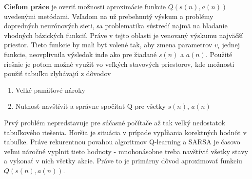 {\bf Cieľom práce} je overiť možnosti aproximácie funkcie $Q(s(n), a(n))$
uvedenými metódami. Vzľadom na už prebehnutý výskum a problémy dopredných
neurónových sieti, sa problematika sústredí najmä
na hľadanie vhodných bázických funkcií. Práve v tejto oblasti je venovaný výskumu
najväčší priestor. Tieto funkcie by mali byť volené tak, aby zmena parametrov $v_i$ jednej
funkcie, neovplivnila výsledok inde ako pre žiadané $s(n)$ a $a(n)$.
Použité riešnie je potom možné využiť vo veľkých stavových priestorov, kde možnosti použiť tabuľku
zlyhávajú z dôvodov
\begin{enumerate}
  \item Veľké pamäťové nároky
  \item Nutnosť navštíviť a správne spočítať Q pre všetky $s(n)$, $a(n)$
\end{enumerate}
Prvý problém nepredstavuje pre súčasné počítače až tak veľký nedostatok tabuľkového
riešenia. Horšia je situácia v prípade vypĺňania korektných hodnôt v tabuľke. Práve rekurentnou
povahou algoritmov Q-learning a SARSA je časovo veľmi náročné vyplniť tieto hodnoty -
mnohonásobne treba navštíviť všetky stavy a vykonať v nich všetky akcie. Práve to je
primárny dôvod aproximovať funkciu $Q(s(n), a(n))$.
